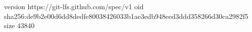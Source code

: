 version https://git-lfs.github.com/spec/v1
oid sha256:de9b2e00d6dd8dedfe80038426033b1ae3edb948eed3ddd358266d30ca2982f5
size 43840
